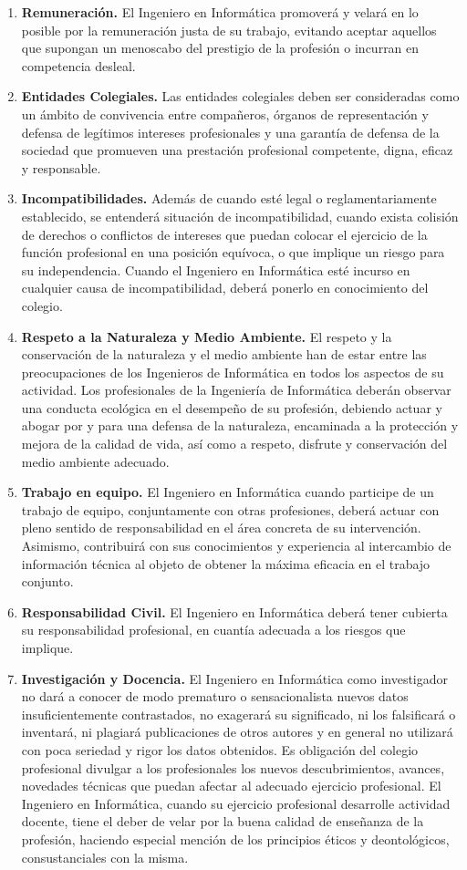 \begin{enumerate}[label=\textbf{\arabic*.}]
    \item\textbf{Remuneración.} El Ingeniero en Informática promoverá y velará en lo posible por la remuneración justa de su trabajo, evitando aceptar aquellos que supongan un menoscabo del prestigio de la profesión o incurran en competencia desleal.
    \item\textbf{Entidades Colegiales.} Las entidades colegiales deben ser consideradas como un ámbito de convivencia entre compañeros, órganos de representación y defensa de legítimos intereses profesionales y una garantía de defensa de la sociedad que promueven una prestación profesional competente, digna, eficaz y responsable.
    \item\textbf{Incompatibilidades.} Además de cuando esté legal o reglamentariamente establecido, se entenderá situación de incompatibilidad, cuando exista colisión de derechos o conflictos de intereses que puedan colocar el ejercicio de la función profesional en una posición equívoca, o que implique un riesgo para su independencia. Cuando el Ingeniero en Informática esté incurso en cualquier causa de incompatibilidad, deberá ponerlo en conocimiento del colegio.
    \item\textbf{Respeto a la Naturaleza y Medio Ambiente.} El respeto y la conservación de la naturaleza y el medio ambiente han de estar entre las preocupaciones de los Ingenieros de Informática en todos los aspectos de su actividad. Los profesionales de la Ingeniería de Informática deberán observar una conducta ecológica en el desempeño de su profesión, debiendo actuar y abogar por y para una defensa de la naturaleza, encaminada a la protección y mejora de la calidad de vida, así como a respeto, disfrute y conservación del medio ambiente adecuado.
    \item\textbf{Trabajo en equipo.} El Ingeniero en Informática cuando participe de un trabajo de equipo, conjuntamente con otras profesiones, deberá actuar con pleno sentido de responsabilidad en el área concreta de su intervención. Asimismo, contribuirá con sus conocimientos y experiencia al intercambio de información técnica al objeto de obtener la máxima eficacia en el trabajo conjunto.
    \item\textbf{Responsabilidad Civil.} El Ingeniero en Informática deberá tener cubierta su responsabilidad profesional, en cuantía adecuada a los riesgos que implique.
    \item\textbf{Investigación y Docencia.} El Ingeniero en Informática como investigador no dará a conocer de modo prematuro o sensacionalista nuevos datos insuficientemente contrastados, no exagerará su significado, ni los falsificará o inventará, ni plagiará publicaciones de otros autores y en general no utilizará con poca seriedad y rigor los datos obtenidos. Es obligación del colegio profesional divulgar a los profesionales los nuevos descubrimientos, avances, novedades técnicas que puedan afectar al adecuado ejercicio profesional. El Ingeniero en Informática, cuando su ejercicio profesional desarrolle actividad docente, tiene el deber de velar por la buena calidad de enseñanza de la profesión, haciendo especial mención de los principios éticos y deontológicos, consustanciales con la misma.

\end{enumerate}

